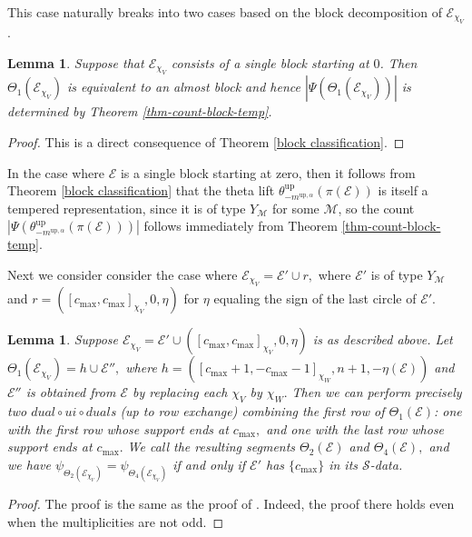 \documentclass[11pt,letterpaper]{amsart}
\newcommand{\up}{{\mathrm{up}}}
\newcommand{\EE}{\mathcal{E}}
\newtheorem{lemma}[thm]{Lemma}
\numberwithin{equation}{section}
\begin{document}
This case naturally breaks into two cases based on the block decomposition of $\EE_{\chi_V}$.


\begin{lemma}
Suppose that $\EE_{\chi_V}$ consists of a single block starting at $0$. Then $\Theta_1(\EE_{\chi_V})$ is equivalent to an almost block and hence $|\Psi(\Theta_1(\EE_{\chi_V}))|$ is determined by Theorem \ref{thm-count-block-temp}.
\end{lemma}
\begin{proof}
This is a direct consequence of Theorem \ref{block classification}.
\end{proof}


 In the case where $\mathcal{E}$ is a single block starting at zero, then it follows from Theorem \ref{block classification} that the theta lift $\theta_{-m^{\up, \alpha}}^\up(\pi(\mathcal{E}))$ is itself a tempered representation, since it is of type $Y_\mathcal{M}$ for some $\mathcal{M}$, so the count $|\Psi(\theta_{-m^{\up, \alpha}}^\up(\pi(\mathcal{E})))|$ follows immediately from Theorem \ref{thm-count-block-temp}. 

Next we consider consider the case where $\mathcal{E}_{\chi_V}=\mathcal{E}' \cup r,$ where $\mathcal{E}'$ is of type $Y_\mathcal{M}$ and $r = ([c_{\max}, c_{\max}]_{\chi_V}, 0, \eta)$ for $\eta$ equaling the sign of the last circle of $\mathcal{E}'.$ 


\begin{lemma}
\label{duds for almost block}
    Suppose $\mathcal{E}_{\chi_V} = \mathcal{E}' \cup ([c_{\max}, c_{\max}]_{\chi_V}, 0, \eta)$ is as described above. Let $\Theta_1(\mathcal{E}_{\chi_V}) = h \cup \mathcal{E}'',$ where $h = ([c_{\max} + 1, -c_{\max} - 1]_{\chi_W}, n + 1, -\eta(\mathcal{E}))$ and $\EE''$ is obtained from $\EE$ by replacing each $\chi_V$ by $\chi_W.$ Then we can perform precisely two $dual \circ ui \circ dual$s (up to row exchange) combining the first row of $\Theta_1(\mathcal{E})$: one with the first row whose support ends at $c_{\max},$ and one with the last row whose support ends at $c_{\max}.$ We call the resulting segments $\Theta_2(\mathcal{E})$ and $\Theta_4(\mathcal{E}),$ and we have $\psi_{\Theta_2(\mathcal{E}_{\chi_V})} = \psi_{\Theta_4(\mathcal{E}_{\chi_V})}$ if and only if $\EE'$ has $\{c_{\max}\}$ in its $\mathcal{S}$-data.
\end{lemma}

\begin{proof}
The proof is the same as the proof of \cite[Lemma 5.39]{HKT26}. Indeed, the proof there holds even when the multiplicities are not odd.   
\end{proof}
\end{document}
